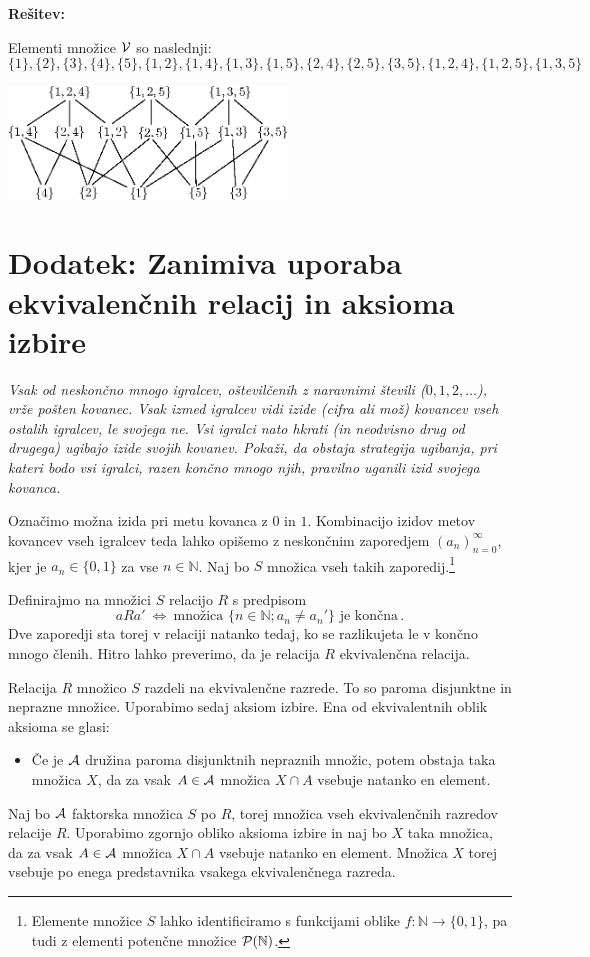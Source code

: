 \documentclass[11pt,paper=b5,footinclude,headinclude]{scrbook} %
\def\cee {{~\Leftrightarrow~}}
\begin{document}
\textbf{Rešitev:}

Elementi množice ${\cal V}$ so naslednji:
$$\{1\},\{2\},\{3\},\{4\},\{5\},
 \{1,2\}, \{1,4\}, \{1,3\}, \{1,5\},\{2,4\},\{2,5\}, \{3,5\},
 \{1,2,4\}, \{1,2,5\}, \{1,3,5\}$$
\begin{center}
\includegraphics[height=30mm]{verige2.eps}
\end{center}



\section{Dodatek: Zanimiva uporaba ekvivalenčnih relacij in aksioma izbire}

\emph{ Vsak od neskončno mnogo igralcev, oštevilčenih z naravnimi števili ($0,1,2,\ldots$), vrže pošten kovanec.
Vsak izmed igralcev vidi izide (cifra ali mož) kovancev vseh ostalih igralcev, le svojega ne.
Vsi igralci nato hkrati (in neodvisno drug od drugega) ugibajo izide svojih kovanev.
Pokaži, da obstaja strategija ugibanja, pri kateri bodo vsi igralci, razen končno mnogo njih, pravilno uganili izid svojega kovanca.}

\bigskip
Označimo možna izida pri metu kovanca z $0$ in $1$.  Kombinacijo izidov metov kovancev vseh igralcev teda lahko opišemo
z neskončnim zaporedjem $(a_n)_{n = 0}^\infty$, kjer je $a_n\in \{0,1\}$ za vse $n\in \mathbb{N}$.
Naj bo $S$ množica vseh takih zaporedij.\footnote{Elemente množice $S$ lahko identificiramo s funkcijami
oblike $f:\mathbb{N}\to\{0,1\}$, pa tudi z elementi potenčne množice ${\cal P}(\mathbb{N})$.}


Definirajmo na množici $S$ relacijo $R$ s predpisom
$$aRa' \cee \textrm{množica $\{n\in \mathbb{N}; a_n\neq a_n'\}$ je končna}\,.$$
Dve zaporedji sta torej v relaciji natanko tedaj, ko se razlikujeta le v končno mnogo členih.
Hitro lahko preverimo, da je relacija $R$ ekvivalenčna relacija.

Relacija $R$ množico $S$ razdeli na ekvivalenčne razrede.
To so paroma disjunktne in neprazne množice.
Uporabimo sedaj aksiom izbire. Ena od ekvivalentnih oblik aksioma se glasi:
\begin{itemize}
 \item Če je ${\cal A}$ družina paroma disjunktnih nepraznih množic, potem obstaja taka  množica $X$, da za vsak $A\in {\cal A}$ množica $X\cap A$ vsebuje natanko en element.
\end{itemize}
Naj bo ${\cal A}$ faktorska množica $S$ po $R$, torej množica vseh ekvivalenčnih razredov relacije $R$.
Uporabimo zgornjo obliko aksioma izbire in naj bo $X$ taka množica, da za vsak $A\in {\cal A}$ množica $X\cap A$ vsebuje natanko en element.
Množica $X$ torej vsebuje po enega predstavnika vsakega ekvivalenčnega razreda.
\end{document}
